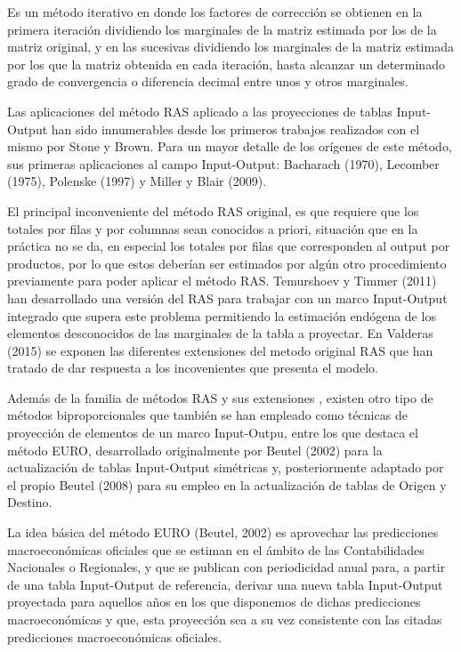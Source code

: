 \documentclass{article}
\begin{document}
Es un método iterativo en donde los factores de corrección se obtienen en la primera iteración dividiendo los marginales de la matriz estimada por los de la matriz original, y en las sucesivas dividiendo los marginales de la matriz estimada por los que la matriz obtenida en cada iteración, hasta alcanzar un determinado grado de convergencia o diferencia decimal entre unos y otros marginales.

Las aplicaciones del método RAS aplicado a las proyecciones de tablas Input-Output han sido innumerables desde los primeros trabajos realizados con el mismo por Stone y Brown. Para un mayor detalle de los orígenes de este método, sus primeras aplicaciones al campo Input-Output:  Bacharach (1970), Lecomber (1975), Polenske (1997) y Miller y Blair (2009).

El principal inconveniente del método RAS original, es que requiere que los totales por filas y por columnas sean conocidos a priori, situación que en la práctica no se da, en especial los totales por filas que corresponden al output por productos, por lo que estos deberían ser estimados por algún otro procedimiento previamente para poder aplicar el método RAS. Temurshoev y Timmer (2011) han desarrollado una versión del RAS para trabajar con un marco Input-Output integrado que supera este problema permitiendo la estimación endógena de los elementos desconocidos de las marginales de la tabla a proyectar. En Valderas (2015) se exponen las diferentes extensiones del metodo original RAS que han tratado de dar respuesta a los incovenientes que presenta el modelo.


Además de la familia de métodos RAS y sus extensiones , existen otro tipo de métodos biproporcionales que también se han empleado como técnicas de proyección de elementos de un marco Input-Outpu, entre los que destaca el método EURO, desarrollado originalmente por Beutel (2002) para la actualización de tablas Input-Output simétricas y, posteriormente adaptado por el propio Beutel (2008) para su empleo en la actualización de tablas de Origen y Destino.

La idea básica del método EURO (Beutel, 2002) es aprovechar las predicciones macroeconómicas oficiales que se estiman en el ámbito de las Contabilidades Nacionales o Regionales, y que se publican con periodicidad anual para, a partir de una tabla Input-Output de referencia, derivar una nueva tabla Input-Output proyectada para aquellos años en los que disponemos de dichas predicciones macroeconómicas y que, esta proyección sea a su vez consistente con las citadas predicciones macroeconómicas oficiales.
\end{document}
